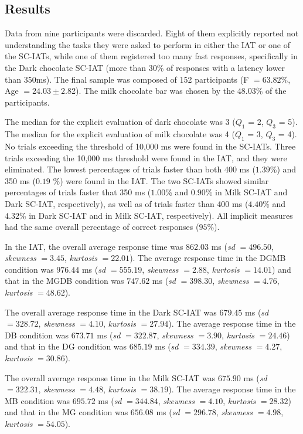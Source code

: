 \documentclass[12pt]{book}
\begin{document}
\subsection{Results}\label{fairer:results}

Data from nine participants were discarded. Eight of them explicitly reported not understanding the tasks they were asked to perform in either the IAT or one of the SC-IATs, while one of them registered too many fast responses, specifically in the Dark chocolate SC-IAT (more than 30\% of responses with a latency lower than 350ms). 
The final sample was composed of 152 participants (F $= 63.82$\%, Age $= 24.03 \pm 2.8$2). The milk chocolate bar was chosen by the $48.03$\% of the participants. 

The median for the explicit evaluation of dark chocolate was 3 ($Q_{1}$ = 2, $Q_{3}$ = 5). The median for the explicit evaluation of milk chocolate was 4 ($Q_1$ = 3, $Q_3$ = 4). No trials exceeding the threshold of 10,000 ms were found in the SC-IATs. Three trials exceeding the 10,000 ms threshold were found in the IAT, and they were eliminated. 
The lowest percentages of trials faster than both 400 ms ($1.39$\%) and 350 ms ($0.19$ \%) were found in the IAT. The two SC-IATs showed similar percentages of trials faster that 350 ms ($1.00$\% and $0.90$\% in Milk SC-IAT and Dark SC-IAT, respectively), as well as of trials faster than 400 ms ($4.40$\% and $4.32$\% in Dark SC-IAT and in Milk SC-IAT, respectively).
All implicit measures had the same overall percentage of correct responses ($95$\%).

In the IAT, the overall average response time was $862.03$ ms (\emph{sd} $= 496.50$, \emph{skewness} $= 3.45$, \emph{kurtosis} $= 22.01$). The average response time in the DGMB condition was $976.44$ ms (\emph{sd} $= 555.19$, \emph{skewness} $= 2.88$, \emph{kurtosis} $= 14.01$) and that in the MGDB condition was $747.62$ ms (\emph{sd} $= 398.30$, \emph{skewness} $= 4.76$, \emph{kurtosis} $= 48.62$). 

The overall average response time in the Dark SC-IAT was $679.45$ ms (\emph{sd} $= 328.72$, \emph{skewness} $= 4.10$, \emph{kurtosis} $= 27.94$). The average response time in the DB condition was $673.71$ ms (\emph{sd} $= 322.87$, \emph{skewness} $= 3.90$, \emph{kurtosis} $= 24.46$) and that in the DG condition was $685.19$ ms (\emph{sd} $= 334.39$, \emph{skewness} $= 4.27$, \emph{kurtosis} $= 30.86$). 

The overall average response time in the Milk SC-IAT was $675.90$ ms (\emph{sd} $= 322.31$, \emph{skewness} $= 4.48$, \emph{kurtosis} $= 38.19$). The average response time in the MB condition was $695.72$ ms (\emph{sd} $= 344.84$, \emph{skewness} $= 4.10$, \emph{kurtosis} $= 28.32$) and that in the MG condition was $656.08$ ms (\emph{sd} $= 296.78$, \emph{skewness} $= 4.98$, \emph{kurtosis} $= 54.05$). 
\end{document}
